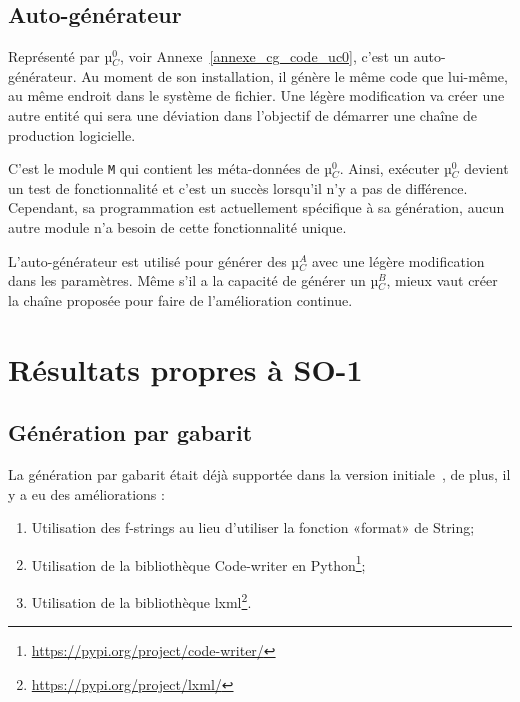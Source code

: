 \subsection{Auto-générateur}

Représenté par µ$_C^0$, voir Annexe~\ref{annexe_cg_code_uc0}, c’est un auto-générateur. Au moment de son installation, il génère le même code que lui-même, au même endroit dans le système de fichier. Une légère modification va créer une autre entité qui sera une déviation dans l’objectif de démarrer une chaîne de production logicielle.

C'est le module \texttt{M} qui contient les méta-données de µ$_C^0$. Ainsi, exécuter µ$_C^0$ devient un test de fonctionnalité et c'est un succès lorsqu'il n'y a pas de différence. Cependant, sa programmation est actuellement spécifique à sa génération, aucun autre module n’a besoin de cette fonctionnalité unique.




L'auto-générateur est utilisé pour générer des µ$_C^A$ avec une légère modification dans les paramètres. Même s'il a la capacité de générer un µ$_C^B$, mieux vaut créer la chaîne proposée pour faire de l'amélioration continue.

\section{Résultats propres à SO-1}

\subsection{Génération par gabarit}

La génération par gabarit était déjà supportée dans la version initiale~\cite{bluiksnot_repo}, de plus, il y a eu des améliorations :
\begin{enumerate}
    \item Utilisation des f-strings au lieu d'utiliser la fonction «format» de String;
    \item Utilisation de la bibliothèque Code-writer en Python\footnote{\url{https://pypi.org/project/code-writer/}};
    \item Utilisation de la bibliothèque lxml\footnote{\url{https://pypi.org/project/lxml/}}.
\end{enumerate}

